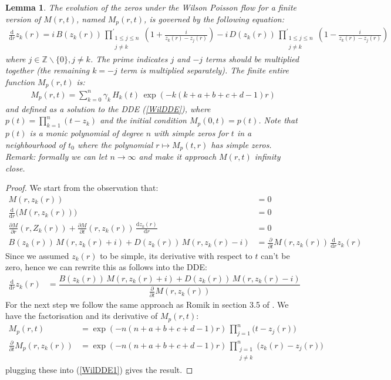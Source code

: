 \documentclass[a4paper,11pt,twoside]{amsart}
\newtheorem{lemma}[theorem]{Lemma}
\newcommand{\verifiedeq}{=}
\newcommand{\defeq}{=}
\newcommand{\verifiedeq}{\stackrel{\checkmark}{=}}
\newcommand{\defeq}{\stackrel{\scriptscriptstyle \textnormal{def}}{=}}
\begin{document}
\begin{lemma}\label{proofWil2} The evolution of the zeros under the Wilson Poisson flow for a finite version of $M(r,t)$, named $M_p(r,t)$, is governed by the following equation:
\begin{align}
 \frac{\mathrm{d}}{\mathrm{d} r}z_k(r) \verifiedeq i\,B(z_k(r))\, \prod^{'}_{\substack{1\le j \le n \\j \ne k}}\left(1+ \frac{i}{z_k(r)-z_j(r)}\right) -i\,D(z_k(r))\,\prod^{'}_{\substack{1\le j \le n \\j \ne k}} \left(1-\frac{i}{z_k(r)-z_j(r)}\right)
\end{align}
where $j \in \mathbb{Z}\backslash\{0\}, j \ne k$. The prime indicates $j$ and $-j$ terms should be multiplied together (the remaining $k=-j$ term is multiplied separately). The finite entire function $M_p(r,t)$ is:
\begin{align}
M_p(r,t) \verifiedeq \sum_{k=0}^n \gamma_k \, H_k(t)\,\exp(-k(k+a+b+c+d-1)r) 
\end{align}
and defined as a solution to the DDE (\ref{WilDDE}), where $p(t) \defeq \prod_{k=1}^n(t-z_k)$ and the initial condition $M_p(0,t) \defeq p(t)$. Note that $p(t)$ is a monic polynomial of degree $n$ with simple zeros for $t$ in a neighbourhood of $t_0$ where the polynomial $r \mapsto M_p(t,r)$ has simple zeros. Remark: formally we can let $n\to\infty$ and make it approach $M(r,t)$ infinity close.
\end{lemma}
\begin{proof}
We start from the observation that:
\begin{align}
M(r,z_k(r)) &\verifiedeq 0 \\
\frac{\mathrm{d}}{\mathrm{d} r} \big(M(r,z_k(r))\big) &\verifiedeq 0 \\
\frac{\partial M}{\partial r}(r,Z_k(r))+ \frac{\partial M}{\partial t}(r,z_k(r))\,\frac{\mathrm{d} z_k(r)}{\mathrm{d} r} &\verifiedeq 0 \\
B(z_k(r))\,M(r,z_k(r)+i) + D(z_k(r))\,M(r,z_k(r)-i)  &\verifiedeq \frac{\partial}{\partial t}M(r,z_k(r))\,\frac{\mathrm{d}}{\mathrm{d} r}z_k(r)
\end{align}
Since we assumed $z_k(r)$ to be simple, its derivative with respect to $t$ can't be zero, hence we can rewrite this as follows into the DDE:
\begin{align} \label{WilDDE1}
\frac{\mathrm{d} }{\mathrm{d} r}z_k(r) &\verifiedeq \dfrac{B(z_k(r))\,M(r,z_k(r)+i) + D(z_k(r))\,M(r,z_k(r)-i)}{ \frac{\partial}{\partial t}M(r,z_k(r))}
\end{align}
For the next step we follow the same approach as Romik in section 3.5 of \cite{rom}. We have the factorisation and its derivative of $M_p(r,t)$: 
\begin{align}
M_p(r,t) &\verifiedeq \exp(-n(n+a+b+c+d-1)r)\,\prod_{j=1}^n\bigg(t-z_j(r)\bigg)\\
\frac{\partial}{\partial t} M_p(r,z_k(r)) &\verifiedeq \exp\left(-n(n+a+b+c+d-1)r\right)\,\prod^n_{\substack{j=1\\j\ne k}}\bigg(z_k(r)-z_j(r)\bigg)
\end{align}
plugging these into (\ref{WilDDE1}) gives the result.
\end{proof}
\end{document}
